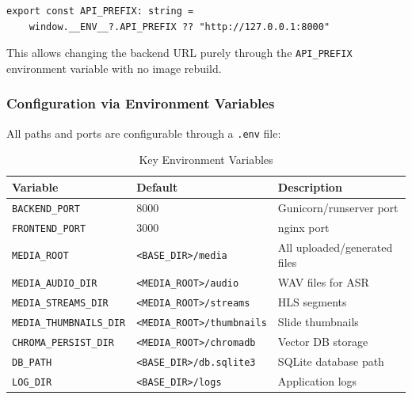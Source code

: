 \begin{lstlisting}[language=text, caption={Frontend Runtime Config (config.ts)}]
export const API_PREFIX: string =
    window.__ENV__?.API_PREFIX ?? "http://127.0.0.1:8000"
\end{lstlisting}

This allows changing the backend URL purely through the \texttt{API\_PREFIX} environment variable with no image rebuild.

\subsubsection{Configuration via Environment Variables}

All paths and ports are configurable through a \texttt{.env} file:

\begin{table}[H]
    \centering
    \caption{Key Environment Variables}
    \begin{tabular}{@{}lll@{}}
        \toprule
        \textbf{Variable} & \textbf{Default} & \textbf{Description} \\ \midrule
        \texttt{BACKEND\_PORT}        & 8000                      & Gunicorn/runserver port \\
        \texttt{FRONTEND\_PORT}       & 3000                      & nginx port \\
        \texttt{MEDIA\_ROOT}          & \texttt{\textless{}BASE\_DIR\textgreater{}/media}  & All uploaded/generated files \\
        \texttt{MEDIA\_AUDIO\_DIR}    & \texttt{\textless{}MEDIA\_ROOT\textgreater{}/audio}      & WAV files for ASR \\
        \texttt{MEDIA\_STREAMS\_DIR}  & \texttt{\textless{}MEDIA\_ROOT\textgreater{}/streams}    & HLS segments \\
        \texttt{MEDIA\_THUMBNAILS\_DIR} & \texttt{\textless{}MEDIA\_ROOT\textgreater{}/thumbnails} & Slide thumbnails \\
        \texttt{CHROMA\_PERSIST\_DIR} & \texttt{\textless{}MEDIA\_ROOT\textgreater{}/chromadb}   & Vector DB storage \\
        \texttt{DB\_PATH}             & \texttt{\textless{}BASE\_DIR\textgreater{}/db.sqlite3}   & SQLite database path \\
        \texttt{LOG\_DIR}             & \texttt{\textless{}BASE\_DIR\textgreater{}/logs}         & Application logs \\ \bottomrule
    \end{tabular}
\end{table}

